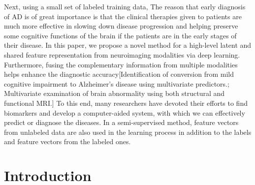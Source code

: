 Next, using a small set of labeled training data,
The reason that early diagnosis of AD is of great importance is that the clinical therapies given to patients are much more effective in slowing down disease progression and helping preserve some cognitive functions of the brain if the patients are in the early stages of their disease.
In this paper, we propose a novel method for a high-level latent and shared feature representation from neuroimaging modalities via deep learning. 
Furthermore, fusing the complementary information from multiple modalities helps enhance the diagnostic accuracy[Identiﬁcation of conversion from mild cognitive impairment to Alzheimer's disease using multivariate predictors.; Multivariate examination of brain abnormality using both structural and functional MRI.]
To this end, many researchers have devoted their efforts to ﬁnd biomarkers and develop a computer-aided system, with which we can effectively predict or diagnose the diseases.
In a semi-supervised method, feature vectors from unlabeled data are also used in the learning process in addition to the labels and feature vectors from the labeled ones.
\fi

\section{Introduction}

